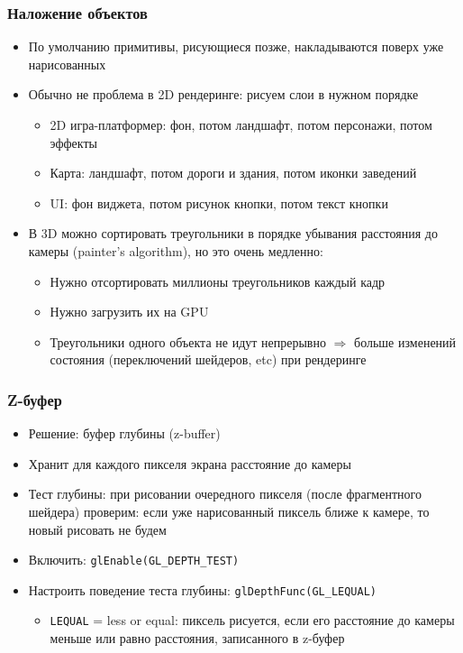 \documentclass{beamer}
\begin{document}
\begin{frame}[fragile]
\frametitle{Наложение объектов}
\begin{itemize}
\item По умолчанию примитивы, рисующиеся позже, накладываются поверх уже нарисованных
\pause
\item Обычно не проблема в 2D рендеринге: рисуем слои в нужном порядке
\pause
\begin{itemize}
\item 2D игра-платформер: фон, потом ландшафт, потом персонажи, потом эффекты
\pause
\item Карта: ландшафт, потом дороги и здания, потом иконки заведений
\pause
\item UI: фон виджета, потом рисунок кнопки, потом текст кнопки
\end{itemize}
\pause
\item В 3D можно сортировать треугольники в порядке убывания расстояния до камеры (painter's algorithm), но это очень медленно:
\pause
\begin{itemize}
\item Нужно отсортировать миллионы треугольников каждый кадр
\pause
\item Нужно загрузить их на GPU
\pause
\item Треугольники одного объекта не идут непрерывно \begin{math}\Rightarrow\end{math} больше изменений состояния (переключений шейдеров, etc) при рендеринге
\end{itemize}
\end{itemize}
\end{frame}

\begin{frame}[fragile]
\frametitle{Z-буфер}
\begin{itemize}
\item Решение: буфер глубины (z-buffer)
\pause
\item Хранит для каждого пикселя экрана расстояние до камеры
\pause
\item Тест глубины: при рисовании очередного пикселя (после фрагментного шейдера) проверим: если уже нарисованный пиксель ближе к камере, то новый рисовать не будем
\pause
\item Включить: \verb|glEnable(GL_DEPTH_TEST)|
\pause
\item Настроить поведение теста глубины: \verb|glDepthFunc(GL_LEQUAL)|
\begin{itemize}
\item \verb|LEQUAL| = less or equal: пиксель рисуется, если его расстояние до камеры меньше или равно расстояния, записанного в z-буфер
\end{itemize}
\end{itemize}
\end{frame}
\end{document}
